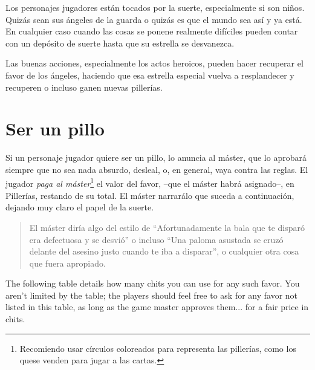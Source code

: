
Los personajes jugadores están tocados por la suerte, especialmente
si son niños. Quizás sean sus ángeles de la guarda o quizás es que 
el mundo sea así y ya está. En cualquier caso cuando las cosas se
ponene realmente difíciles pueden contar con un depósito de suerte hasta
que su estrella se desvanezca.

Las buenas acciones, especialmente los actos heroicos, pueden hacer
recuperar el favor de los ángeles, haciendo que esa estrella especial
vuelva a resplandecer y recuperen o incluso ganen nuevas pillerías.

\section{Ser un pillo}

Si un personaje jugador quiere ser un pillo, lo anuncia al máster, que
lo aprobará siempre que no sea nada absurdo, desleal, o, en general, vaya
contra las reglas. El jugador \emph{paga al máster}\footnote{Recomiendo usar 
círculos coloreados para representa las pillerías, como los quese venden para 
jugar a las cartas.} el valor del favor, --que el máster habrá asignado--, en 
Pillerías, restando de su total. El máster narrarálo que suceda a continuación, 
dejando muy claro el papel de la suerte.

\begin{quotation}

El máster diría algo del estilo de \enquote{Afortunadamente la bala que te
disparó era defectuosa y se desvió} o incluso \enquote{Una paloma asustada se
cruzó delante del asesino justo cuando te iba a disparar}, o cualquier otra cosa
que fuera apropiado.

\end{quotation}

The following table details how many chits you can use for any such
favor. You aren't limited by the table; the players should feel free
to ask for any favor not listed in this table, as long as the game
master approves them... for a fair price in chits.

\begin{center}
\label{sub:Using Chits Table}
\par\end{center}

